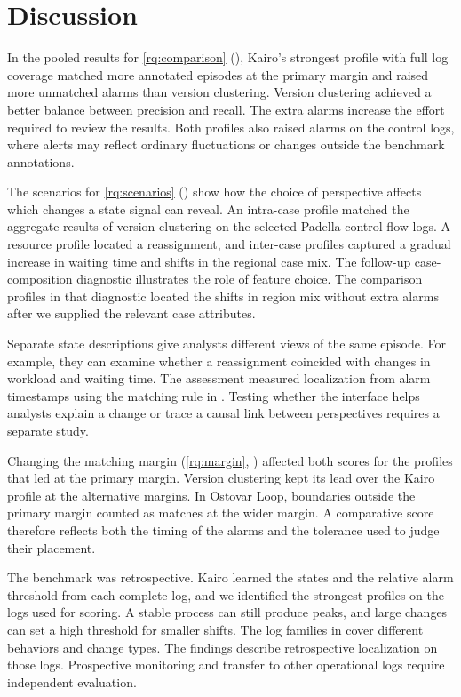\section{Discussion}
\label{sec:discussion}

In the pooled results for \ref*{rq:comparison} (), Kairo's strongest profile with full log coverage matched more annotated episodes at the primary margin and raised more unmatched alarms than version clustering. Version clustering achieved a better balance between precision and recall. The extra alarms increase the effort required to review the results. Both profiles also raised alarms on the control logs, where alerts may reflect ordinary fluctuations or changes outside the benchmark annotations.

The scenarios for \ref*{rq:scenarios} () show how the choice of perspective affects which changes a state signal can reveal. An intra-case profile matched the aggregate results of version clustering on the selected Padella control-flow logs. A resource profile located a reassignment, and inter-case profiles captured a gradual increase in waiting time and shifts in the regional case mix. The follow-up case-composition diagnostic illustrates the role of feature choice. The comparison profiles in that diagnostic located the shifts in region mix without extra alarms after we supplied the relevant case attributes.

Separate state descriptions give analysts different views of the same episode. For example, they can examine whether a reassignment coincided with changes in workload and waiting time. The assessment measured localization from alarm timestamps using the matching rule in . Testing whether the interface helps analysts explain a change or trace a causal link between perspectives requires a separate study.

Changing the matching margin (\ref*{rq:margin}, ) affected both scores for the profiles that led at the primary margin. Version clustering kept its lead over the Kairo profile at the alternative margins. In Ostovar Loop, boundaries outside the primary margin counted as matches at the wider margin. A comparative score therefore reflects both the timing of the alarms and the tolerance used to judge their placement.

The benchmark was retrospective. Kairo learned the states and the relative alarm threshold from each complete log, and we identified the strongest profiles on the logs used for scoring. A stable process can still produce peaks, and large changes can set a high threshold for smaller shifts. The log families in  cover different behaviors and change types. The findings describe retrospective localization on those logs. Prospective monitoring and transfer to other operational logs require independent evaluation.
